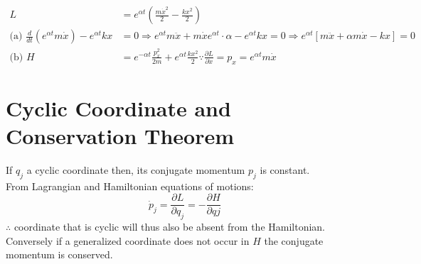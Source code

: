 	\begin{answer}
	\begin{align*}
	L&=e^{\alpha t}\left(\frac{m \dot{x}^{2}}{2}-\frac{k x^{2}}{2}\right)\\
	\text{(a) }\frac{d}{d t}\left(e^{\alpha t} m \dot{x}\right)-e^{\alpha t} k x&=0 \Rightarrow e^{\alpha t} m \ddot{x}+m \dot{x} e^{\alpha t} \cdot \alpha-e^{\alpha t} k x=0 \Rightarrow e^{\alpha t}[m \ddot{x}+\alpha m \dot{x}-k x]=0\\
	\text{(b) }H&=e^{-\alpha t} \frac{p_{x}^{2}}{2 m}+e^{\alpha t} \frac{k x^{2}}{2}
	\because \frac{\partial L}{\partial \dot{x}}=p_{x}=e^{\alpha t} m \dot{x}
	\end{align*}
\end{answer}
\section{Cyclic Coordinate and Conservation Theorem}
If $q_j$ a cyclic coordinate then, its conjugate momentum $p_j$ is constant.\\
From Lagrangian and Hamiltonian equations of motions:
$$\dot{p}_{j}=\frac{\partial L}{\partial q_{j}}=-\frac{\partial H}{\partial q j}$$
$\therefore$ coordinate that is cyclic will thus also be absent from the Hamiltonian. Conversely if a generalized coordinate does not occur in $H$ the conjugate momentum is conserved.
